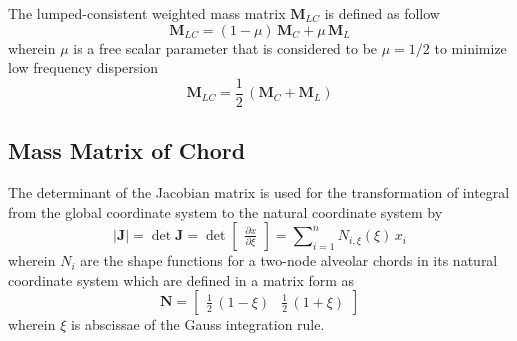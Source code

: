 The lumped-consistent weighted mass matrix $\mathbf{M}_{LC} $ is defined as follow
\begin{equation}
\mathbf{M}_{LC}  = (1 - \mu) \, \mathbf{M}_{C} + \mu \, \mathbf{M}_{L}
\end{equation}
wherein $\mu$ is a free scalar parameter that is considered to be $\mu = 1/2$ to minimize low frequency dispersion
\begin{equation}
\mathbf{M}_{LC}  = \frac{1}{2} \, (\mathbf{M}_{C} + \mathbf{M}_{L})
\label{LumconsMass}
\end{equation}

\subsection{Mass Matrix of Chord}
The determinant of the Jacobian matrix is used for the transformation of integral from the global coordinate system to the natural coordinate system by
\begin{equation}
     |\mathbf{J}| = \mathrm{\det} \mathbf{J} = \mathrm{\det} \begin{bmatrix}\frac{\partial x }{\partial\xi} \end{bmatrix} = \sum\nolimits_{i=1}^n N_{i,\xi} (\xi) \, x_i
     \label{detJac1D}
\end{equation}
wherein $N_{i}$ are the shape functions for a two-node alveolar chords in its natural coordinate system which are defined in a matrix form as
\begin{equation}
	\mathbf{N} = \begin{bmatrix}
    \frac{1}{2} \, (1 - \xi) &  \frac{1}{2} \, (1 + \xi)
\end{bmatrix} 
\end{equation}
wherein $\xi$ is abscissae of the Gauss integration rule. 

